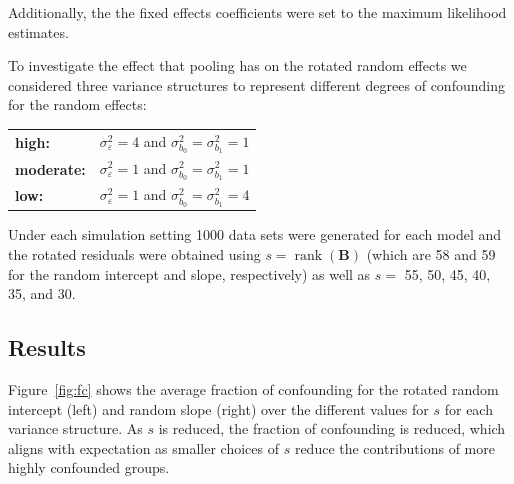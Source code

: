 \documentclass[12pt]{article} %
\DeclareMathOperator{\rank}{rank}
\begin{document}
Additionally, the the fixed effects coefficients were set to the maximum likelihood estimates.

To investigate the effect that pooling has on the rotated random effects we considered  three variance structures to represent different degrees of confounding for the random effects:\\
%
\begin{tabular}{ll}
\textbf{high:} & $\sigma^2_\varepsilon = 4$ and  $\sigma^2_{b_0} = \sigma^2_{b_1} = 1$ \\
\textbf{moderate:} & $\sigma^2_\varepsilon = 1$ and  $\sigma^2_{b_0} = \sigma^2_{b_1} = 1$ \\
\textbf{low:} & $\sigma^2_\varepsilon = 1$ and  $\sigma^2_{b_0} = \sigma^2_{b_1} = 4$ \\
\end{tabular}
%

Under each simulation setting 1000 data sets were generated for each model and the rotated residuals were obtained using $s = \rank(\bm{B})$ (which are 58 and 59 for the random intercept and slope, respectively) as well as $s =$ 55, 50, 45, 40, 35, and 30.


\subsection{Results}\label{sec:sim-results}


Figure~\ref{fig:fc} shows the average fraction of confounding for the rotated random intercept (left) and random slope (right) over the different values for $s$ for each variance structure. As $s$ is reduced, the fraction of confounding is reduced, which aligns with expectation as smaller choices of $s$ reduce the contributions of more highly confounded groups.
\end{document}
